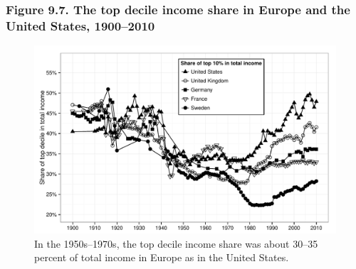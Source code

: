 \documentclass[t]{beamer}\usepackage[]{graphicx}\usepackage[]{color}
\newenvironment{knitrout}{}{} %
\begin{document}
\begin{frame}[label=Figure_9_7]
\frametitle{Figure 9.7. The top decile income share in Europe and the United States, 1900--2010}
\begin{figure}[t]
\begin{minipage}[b]{\textwidth}
\centering
\begin{knitrout}\footnotesize
{}\color{fgcolor}

{\centering \includegraphics[width=1\linewidth]{figures/bw/Figure_9_7} 

}



\end{knitrout}
\caption{In the 1950s--1970s, the top decile income share was about 30--35 percent of total income in Europe as in the United States.}
\end{minipage}
\end{figure}
\end{frame}
\end{document}
